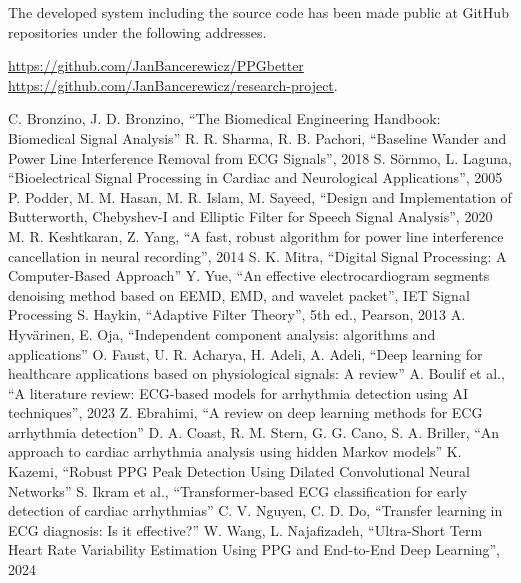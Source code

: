 \documentclass[journal]{IEEEtran}
\begin{document}
\newpage

The developed system including the source code has been made public at GitHub repositories under the following addresses.

\noindent
\href{https://github.com/JanBancerewicz/PPGbetter}{https://github.com/JanBancerewicz/PPGbetter}
\href{https://github.com/JanBancerewicz/research-project}{https://github.com/JanBancerewicz/research-project}.

 

\begin{thebibliography}{1}
C. Bronzino, J. D. Bronzino, “The Biomedical Engineering Handbook: Biomedical Signal Analysis”
R. R. Sharma, R. B. Pachori, “Baseline Wander and Power Line Interference Removal from ECG Signals”, 2018
S. Sörnmo, L. Laguna, “Bioelectrical Signal Processing in Cardiac and Neurological Applications”, 2005
P. Podder, M. M. Hasan, M. R. Islam, M. Sayeed, “Design and Implementation of Butterworth, Chebyshev-I and Elliptic Filter for Speech Signal Analysis”, 2020
M. R. Keshtkaran, Z. Yang, “A fast, robust algorithm for power line interference cancellation in neural recording”, 2014
S. K. Mitra, “Digital Signal Processing: A Computer-Based Approach”
Y. Yue, “An effective electrocardiogram segments denoising method based on EEMD, EMD, and wavelet packet”, IET Signal Processing
S. Haykin, “Adaptive Filter Theory”, 5th ed., Pearson, 2013
A. Hyvärinen, E. Oja, “Independent component analysis: algorithms and applications”
O. Faust, U. R. Acharya, H. Adeli, A. Adeli, “Deep learning for healthcare applications based on physiological signals: A review”
A. Boulif et al., “A literature review: ECG-based models for arrhythmia detection using AI techniques”, 2023
Z. Ebrahimi, “A review on deep learning methods for ECG arrhythmia detection”
D. A. Coast, R. M. Stern, G. G. Cano, S. A. Briller, “An approach to cardiac arrhythmia analysis using hidden Markov models”
K. Kazemi, “Robust PPG Peak Detection Using Dilated Convolutional Neural Networks”
S. Ikram et al., “Transformer-based ECG classification for early detection of cardiac arrhythmias”
C. V. Nguyen, C. D. Do, “Transfer learning in ECG diagnosis: Is it effective?”
W. Wang, L. Najafizadeh, “Ultra-Short Term Heart Rate Variability Estimation Using PPG and End-to-End Deep Learning”, 2024

\end{thebibliography}
\end{document}
